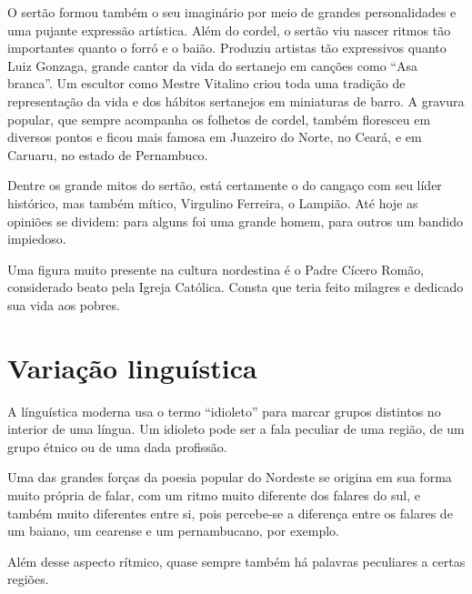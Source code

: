\documentclass[11pt]{hedrabook_ficha}
\begin{document}
O sertão formou também o seu imaginário por meio de grandes personalidades e
uma pujante expressão artística. Além do cordel, o sertão viu nascer ritmos tão
importantes quanto o forró e o baião. Produziu artistas tão expressivos quanto
Luiz Gonzaga, grande cantor da vida do sertanejo em canções como “Asa branca”.
Um escultor como Mestre Vitalino criou toda uma tradição de representação da
vida e dos hábitos sertanejos em miniaturas de barro. A gravura popular, que
sempre acompanha os folhetos de cordel, também floresceu em diversos pontos e
ficou mais famosa em Juazeiro do Norte, no Ceará, e em Caruaru, no estado de
Pernambuco. 

Dentre os grande mitos do sertão, está certamente o do cangaço com seu líder
histórico, mas também mítico, Virgulino Ferreira, o Lampião. Até hoje as
opiniões se dividem: para alguns foi uma grande homem, para outros um bandido
impiedoso. 

Uma figura muito presente na cultura nordestina é o Padre Cícero Romão,
considerado beato pela Igreja Católica. Consta que teria feito milagres e
dedicado sua vida aos pobres. 

\section{Variação linguística}

A línguística moderna usa o termo “idioleto” para marcar grupos distintos no
interior de uma língua. Um idioleto pode ser a fala peculiar de uma região, de
um grupo étnico ou de uma dada profissão. 

Uma das grandes forças da poesia popular do Nordeste se origina em sua forma
muito própria de falar, com um ritmo muito diferente dos falares do sul, e
também muito diferentes entre si, pois percebe-se a diferença entre os falares
de um baiano, um cearense e um pernambucano, por exemplo.

Além desse aspecto rítmico, quase sempre também há palavras peculiares a certas
regiões. 
\end{document}
